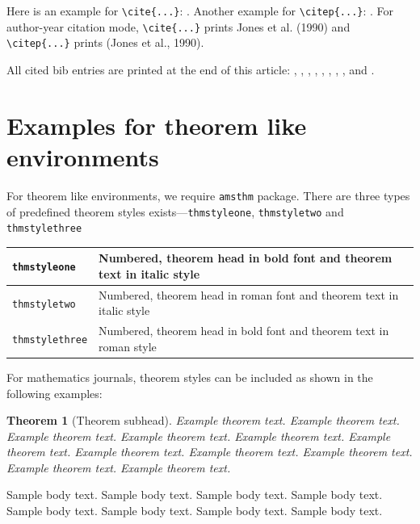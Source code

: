 \documentclass[sn-mathphys]{sn-jnl}%
\theoremstyle{thmstyleone}%
\newtheorem{theorem}{Theorem}%
\theoremstyle{thmstyletwo}%
\theoremstyle{thmstylethree}%
\begin{document}
Here is an example for \verb+\cite{...}+: \cite{bib1}. Another example for \verb+\citep{...}+: \citep{bib2}. For author-year citation mode, \verb+\cite{...}+ prints Jones et al. (1990) and \verb+\citep{...}+ prints (Jones et al., 1990).

All cited bib entries are printed at the end of this article: \cite{bib3}, \cite{bib4}, \cite{bib5}, \cite{bib6}, \cite{bib7}, \cite{bib8}, \cite{bib9}, \cite{bib10}, \cite{bib11} and \cite{bib12}.

\section{Examples for theorem like environments}\label{sec10}

For theorem like environments, we require \verb+amsthm+ package. There are three types of predefined theorem styles exists---\verb+thmstyleone+, \verb+thmstyletwo+ and \verb+thmstylethree+ 

\bigskip
\begin{tabular}{|l|p{19pc}|}
\hline
\verb+thmstyleone+ & Numbered, theorem head in bold font and theorem text in italic style \\\hline
\verb+thmstyletwo+ & Numbered, theorem head in roman font and theorem text in italic style \\\hline
\verb+thmstylethree+ & Numbered, theorem head in bold font and theorem text in roman style \\\hline
\end{tabular}
\bigskip

For mathematics journals, theorem styles can be included as shown in the following examples:

\begin{theorem}[Theorem subhead]\label{thm1}
Example theorem text. Example theorem text. Example theorem text. Example theorem text. Example theorem text. 
Example theorem text. Example theorem text. Example theorem text. Example theorem text. Example theorem text. 
Example theorem text. 
\end{theorem}

Sample body text. Sample body text. Sample body text. Sample body text. Sample body text. Sample body text. Sample body text. Sample body text.
\end{document}
